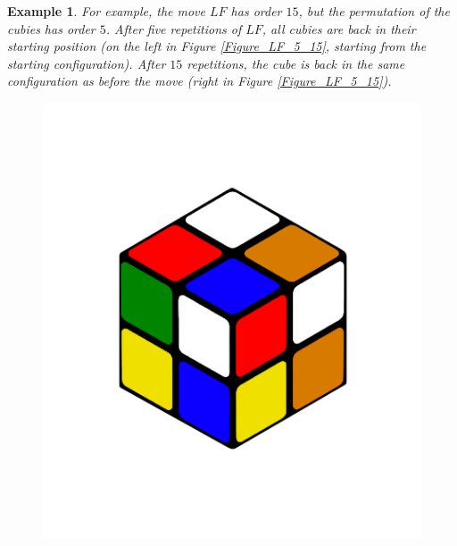 \documentclass[12pt,a4paper]{article}
\theoremstyle{custom}
\newtheorem*{example}{Example}
\begin{document}
\begin{example}
    
For example, the move $LF$ has order $15$, but the permutation of the cubies has order $5$. After five repetitions of $LF$, all cubies are back in their starting position (on the left in Figure \ref{Figure_LF_5_15}, starting from the starting configuration). After $15$ repetitions, the cube is back in the same configuration as before the move (right in Figure \ref{Figure_LF_5_15}).

\begin{figure}[H]
\centering
\includegraphics[scale=0.15]{LLFF_5.png}

\end{figure}
\end{example}
\end{document}
